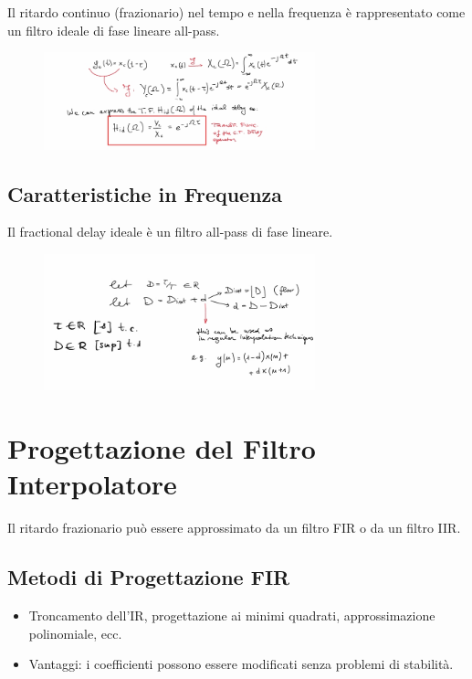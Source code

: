 Il ritardo continuo (frazionario) nel tempo e nella frequenza è rappresentato come un filtro ideale di fase lineare all-pass.

\begin{figure}[H]
    \centering
    \includegraphics[width=0.7\textwidth]{capitoli/capitolo14/immagini/image6.jpeg}
\end{figure}


\subsection{Caratteristiche in Frequenza}

Il fractional delay ideale è un filtro all-pass di fase lineare.

\begin{figure}[H]
    \centering
    \includegraphics[width=0.7\textwidth]{capitoli/capitolo14/immagini/image7.jpeg}
\end{figure}


\section{Progettazione del Filtro Interpolatore}

Il ritardo frazionario può essere approssimato da un filtro FIR o da un filtro IIR.

\subsection{Metodi di Progettazione FIR}

\begin{itemize}
    \item Troncamento dell'IR, progettazione ai minimi quadrati, approssimazione polinomiale, ecc.
    \item Vantaggi: i coefficienti possono essere modificati senza problemi di stabilità.
\end{itemize}

